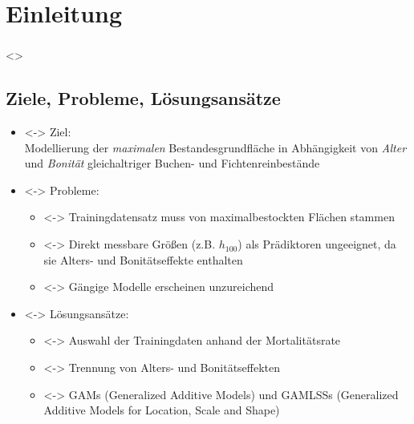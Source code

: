 \section{Einleitung}

\subsubsection*{}
\begin{frame}[c]
  \only<\theFirstElement>{}
\end{frame}

\subsection{Ziele, Probleme, Lösungsansätze}
\begin{frame}[c]
  \begin{itemize}
  \item<\theFirstElement-> Ziel: \\
    Modellierung der \emph{maximalen} Bestandesgrundfläche in Abhängigkeit von \emph{Alter} und \emph{Bonität} gleichaltriger Buchen- und Fichtenreinbestände
  \item<\theSecondElement-> Probleme:
    \begin{itemize}
    \item<\theSecondElement-> Trainingdatensatz muss von maximalbestockten Flächen stammen
    \item<\theSecondElement-> Direkt messbare Größen (z.B. \(h_{100}\)) als Prädiktoren ungeeignet, da sie Alters- und Bonitätseffekte enthalten
    \item<\theSecondElement-> Gängige Modelle erscheinen unzureichend
    \end{itemize}
  \end{itemize}
  \begin{itemize}
  \item<\theThirdElement-> Lösungsansätze:
    \begin{itemize}
    \item<\theThirdElement-> Auswahl der Trainingdaten anhand der Mortalitätsrate
    \item<\theThirdElement-> Trennung von Alters- und Bonitätseffekten
    \item<\theThirdElement-> GAMs (Generalized Additive Models) und GAMLSSs (Generalized Additive Models for Location, Scale and Shape)
    \end{itemize}
  \end{itemize}
\end{frame}

